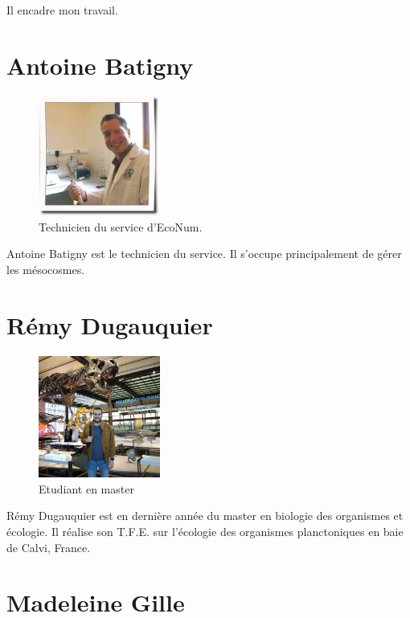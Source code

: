 \documentclass[]{report}
\begin{document}
Il encadre mon travail.

\section{Antoine Batigny}\label{antoine-batigny}

\begin{figure}[h!]
\includegraphics[width=4cm]{../image/antoine2.jpg}
\caption{Technicien du service d'EcoNum.}
\end{figure}

Antoine Batigny est le technicien du service. Il s'occupe principalement
de gérer les mésocosmes.

\section{Rémy Dugauquier}\label{remy-dugauquier}

\begin{figure}[h!]
\includegraphics[width=4cm]{../image/remy.jpg}
\caption{Etudiant en master}
\end{figure}

Rémy Dugauquier est en dernière année du master en biologie des
organismes et écologie. Il réalise son T.F.E. sur l'écologie des
organismes planctoniques en baie de Calvi, France.

\section{Madeleine Gille}\label{madeleine-gille}
\end{document}
